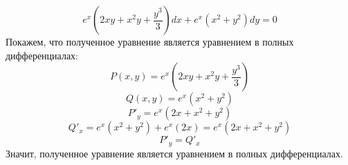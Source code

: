\documentclass[a5paper, 10pt]{article}
\theoremstyle{definition}
\theoremstyle{plain}
\theoremstyle{remark}
\begin{document}
\begin{equation*}
e^x \left( 2xy + x^2y+\frac{y^3}{3} \right)dx + e^x \left(x^2 + y^2 \right)dy = 0
\end{equation*}
Покажем, что полученное уравнение является уравнением в полных дифференциалах:
\begin{equation*}
P(x, y) = e^x \left( 2xy + x^2y+\frac{y^3}{3} \right)
\end{equation*}
\begin{equation*}
Q(x, y) =  e^x \left(x^2 + y^2 \right)
\end{equation*}
\begin{equation*}
P'_y= e^x \left( 2x + x^2+y^2 \right)
\end{equation*}
\begin{equation*}
Q'_x =  e^x \left(x^2 + y^2 \right) + e^x \left(2x \right)  = e^x \left(2x + x^2 + y^2 \right) 
\end{equation*}
\begin{equation*}
P'_y= Q'_x 
\end{equation*}
Значит, полученное уравнение является уравнением в полных дифференциалах.
\end{document}
